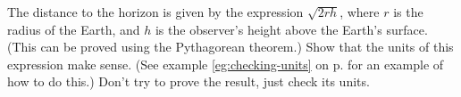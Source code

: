 The distance to the horizon is given by the expression $\sqrt{2rh}$, where $r$ is the
radius of the Earth, and $h$ is the observer's height above the Earth's surface. (This can
be proved using the Pythagorean theorem.) Show that the units of this expression make
sense. (See example \ref{eg:checking-units} on p.
\pageref{eg:checking-units} for an example of how to do this.)
Don't try to prove the result, just check its units.
